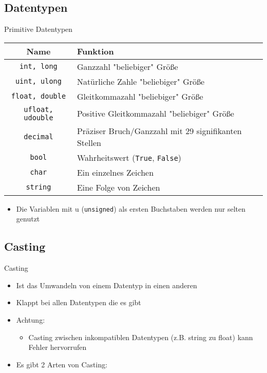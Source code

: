 \subsection{Datentypen}
\begin{frame}{Primitive Datentypen}
	\begin{tabular}{c|l}
		Name & Funktion \\ \hline
		\texttt{int, long} & Ganzzahl "beliebiger" Größe \\
		\texttt{uint, ulong} & Natürliche Zahle "beliebiger" Größe \\
		\texttt{float, double} & Gleitkommazahl "beliebiger" Größe \\
		\texttt{ufloat, udouble} & Positive Gleitkommazahl "beliebiger" Größe \\
        \texttt{decimal} & Präziser Bruch/Ganzzahl mit 29 signifikanten Stellen \\
		\texttt{bool} & Wahrheitswert (\texttt{True}, \texttt{False})\\
        \texttt{char} & Ein einzelnes Zeichen \\
		\texttt{string} & Eine Folge von Zeichen \\
	\end{tabular}
	\begin{itemize}
		 \item Die Variablen mit u (\texttt{unsigned}) als ersten Buchstaben werden nur selten genutzt
	\end{itemize}
\end{frame}

\subsection{Casting}
\begin{frame}{Casting}
	\begin{itemize}
		\item Ist das Umwandeln von einem Datentyp in einen anderen
		\item Klappt bei allen Datentypen die es gibt
		\item Achtung:
		\begin{itemize}
			\item Casting zwischen inkompatiblen Datentypen (z.B. string zu float) kann Fehler hervorrufen
		\end{itemize}
	\end{itemize}
	\begin{itemize}
		\item Es gibt 2 Arten von Casting:
	\end{itemize}
\end{frame}
	
